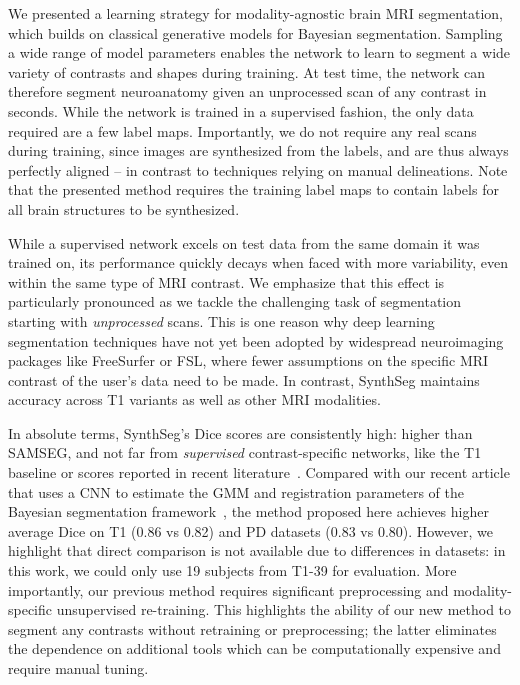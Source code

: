\documentclass{midl}
\newcommand{\netname}{SynthSeg}
\begin{document}
We presented a learning strategy for modality-agnostic brain MRI segmentation, which builds on classical generative models for Bayesian segmentation. Sampling a wide range of model parameters enables the network to learn to segment a wide variety of contrasts and shapes during training. At test time, the network can therefore segment neuroanatomy given an unprocessed scan of any contrast in seconds. While the network is trained in a supervised fashion, the only data required are a few label maps. Importantly, we do not require any real scans during training, since images are synthesized from the labels, and are thus always perfectly aligned -- in contrast to techniques relying on manual delineations. Note that the presented method requires the training label maps to contain labels for all brain structures to be synthesized.

While a supervised network excels on test data from the same domain it was trained on, its performance quickly decays when faced with more variability, even within the same type of MRI contrast. We emphasize that this effect is particularly pronounced as we tackle the challenging task of segmentation starting with \textit{unprocessed} scans. This is one reason why deep learning segmentation techniques have not yet been adopted by widespread neuroimaging packages like FreeSurfer or FSL, where fewer assumptions on the specific MRI contrast of the user's data need to be made. In contrast, \netname{} maintains accuracy across T1 variants as well as other MRI modalities.

In absolute terms, \netname{}'s Dice scores are consistently high: higher than SAMSEG, and not far from \textit{supervised} contrast-specific networks, like the T1 baseline or scores reported in recent literature~\cite{roy_quicknat_2019}. Compared with our recent article that uses a CNN to estimate the GMM and registration parameters of the Bayesian segmentation framework~\cite{dalca_unsupervised_2019}, the method proposed here achieves higher average Dice on T1 (0.86 vs 0.82) and PD datasets (0.83 vs 0.80). However, we highlight that direct comparison is not available due to differences in datasets: in this work, we could only use 19 subjects from T1-39 for evaluation. More importantly, our previous method requires significant preprocessing and modality-specific unsupervised re-training. This highlights the ability of our new method to segment any contrasts without retraining or preprocessing; the latter eliminates the dependence on additional tools which can be computationally expensive and require manual tuning.
\end{document}
